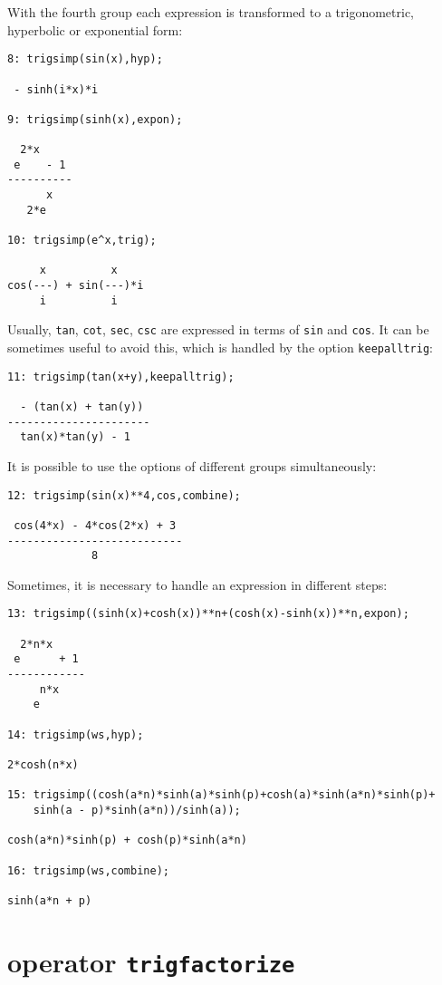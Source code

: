 With the fourth group each expression is transformed to a
trigonometric, hyperbolic or exponential form:
{\small
\begin{verbatim}
8: trigsimp(sin(x),hyp);

 - sinh(i*x)*i

9: trigsimp(sinh(x),expon);

  2*x
 e    - 1
----------
      x
   2*e

10: trigsimp(e^x,trig);

     x          x
cos(---) + sin(---)*i
     i          i
\end{verbatim}
}\noindent

Usually, {\tt tan}, {\tt cot}, {\tt sec}, {\tt csc} are expressed in terms of
{\tt sin} and {\tt cos}. It can
be sometimes useful to avoid this, which is handled by the option
{\tt keepalltrig}:
{\small
\begin{verbatim}
11: trigsimp(tan(x+y),keepalltrig);

  - (tan(x) + tan(y))
----------------------
  tan(x)*tan(y) - 1
\end{verbatim}
}\noindent

It is possible to use the options of different groups simultaneously:
{\small
\begin{verbatim}
12: trigsimp(sin(x)**4,cos,combine);

 cos(4*x) - 4*cos(2*x) + 3
---------------------------
             8
\end{verbatim}
}\noindent

Sometimes, it is necessary to handle an expression in different steps:
{\small
\begin{verbatim}
13: trigsimp((sinh(x)+cosh(x))**n+(cosh(x)-sinh(x))**n,expon);

  2*n*x
 e      + 1
------------
     n*x
    e

14: trigsimp(ws,hyp);

2*cosh(n*x)

15: trigsimp((cosh(a*n)*sinh(a)*sinh(p)+cosh(a)*sinh(a*n)*sinh(p)+
    sinh(a - p)*sinh(a*n))/sinh(a));

cosh(a*n)*sinh(p) + cosh(p)*sinh(a*n)

16: trigsimp(ws,combine);

sinh(a*n + p)
\end{verbatim}
}\noindent

\section{\REDUCE{} operator {\tt trigfactorize}}

